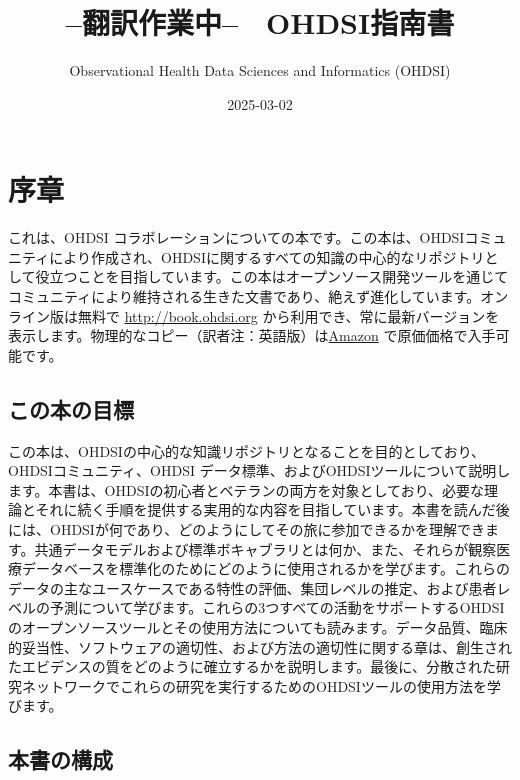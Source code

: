\documentclass[
  11pt]{book}
\title{--翻訳作業中--　OHDSI指南書}
\author{Observational Health Data Sciences and Informatics (OHDSI)}
\date{2025-03-02}
\theoremstyle{definition}
\theoremstyle{definition}
\theoremstyle{definition}
\theoremstyle{definition}
\theoremstyle{remark}
\begin{document}
\maketitle

{
\setcounter{tocdepth}{1}
\tableofcontents
}
\chapter*{序章}\label{ux5e8fux7ae0}

これは、OHDSI コラボレーションについての本です。この本は、OHDSIコミュニティにより作成され、OHDSIに関するすべての知識の中心的なリポジトリとして役立つことを目指しています。この本はオープンソース開発ツールを通じてコミュニティにより維持される生きた文書であり、絶えず進化しています。オンライン版は無料で \url{http://book.ohdsi.org} から利用でき、常に最新バージョンを表示します。物理的なコピー（訳者注：英語版）は\href{https://www.amazon.com/OHDSI-Observational-Health-Sciences-Informatics/dp/1088855199}{Amazon} で原価価格で入手可能です。

\section*{この本の目標}\label{ux3053ux306eux672cux306eux76eeux6a19}

この本は、OHDSIの中心的な知識リポジトリとなることを目的としており、OHDSIコミュニティ、OHDSI データ標準、およびOHDSIツールについて説明します。本書は、OHDSIの初心者とベテランの両方を対象としており、必要な理論とそれに続く手順を提供する実用的な内容を目指しています。本書を読んだ後には、OHDSIが何であり、どのようにしてその旅に参加できるかを理解できます。共通データモデルおよび標準ボキャブラリとは何か、また、それらが観察医療データベースを標準化のためにどのように使用されるかを学びます。これらのデータの主なユースケースである特性の評価、集団レベルの推定、および患者レベルの予測について学びます。これらの3つすべての活動をサポートするOHDSIのオープンソースツールとその使用方法についても読みます。データ品質、臨床的妥当性、ソフトウェアの適切性、および方法の適切性に関する章は、創生されたエビデンスの質をどのように確立するかを説明します。最後に、分散された研究ネットワークでこれらの研究を実行するためのOHDSIツールの使用方法を学びます。

\section*{本書の構成}\label{ux672cux66f8ux306eux69cbux6210}
\end{document}
